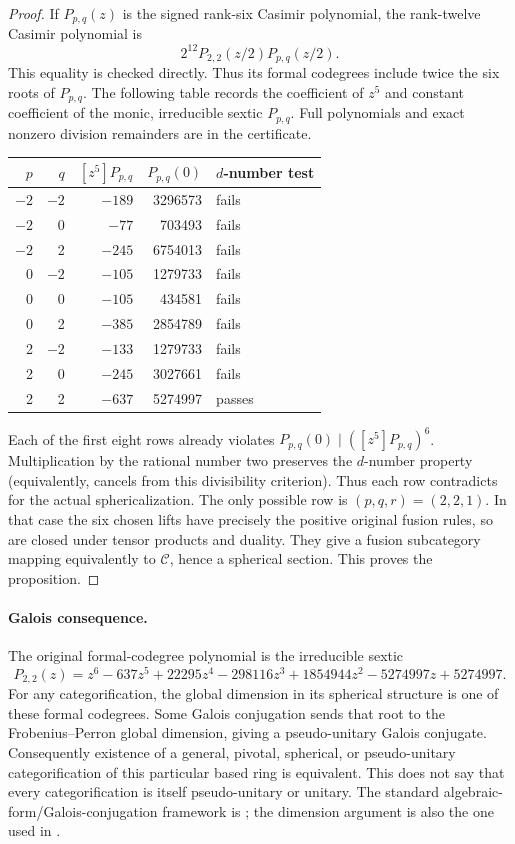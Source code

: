 \documentclass[11pt]{article}
\begin{document}
\begin{proof}
If $P_{p,q}(z)$ is the signed rank-six Casimir polynomial, the rank-twelve
Casimir polynomial is
\[
 2^{12}P_{2,2}(z/2)P_{p,q}(z/2).
\]
This equality is checked directly. Thus its formal codegrees include twice
the six roots of $P_{p,q}$. The following table records the coefficient of
$z^5$ and constant coefficient of the monic, irreducible sextic $P_{p,q}$.
Full polynomials and exact nonzero division remainders are in the certificate.
\begin{center}
\begin{tabular}{rrr r l}\toprule
$p$&$q$&$[z^5]P_{p,q}$&$P_{p,q}(0)$&$d$-number test\\\midrule
$-2$&$-2$&$-189$&3296573&fails\\
$-2$&0&$-77$&703493&fails\\
$-2$&2&$-245$&6754013&fails\\
0&$-2$&$-105$&1279733&fails\\
0&0&$-105$&434581&fails\\
0&2&$-385$&2854789&fails\\
2&$-2$&$-133$&1279733&fails\\
2&0&$-245$&3027661&fails\\
2&2&$-637$&5274997&passes\\\bottomrule
\end{tabular}
\end{center}
Each of the first eight rows already violates
$P_{p,q}(0)\mid([z^5]P_{p,q})^6$. Multiplication by the rational number
two preserves the $d$-number property (equivalently, cancels from this
divisibility criterion). Thus each row contradicts
\cite[Theorem 1.2 and Lemma 2.7(v)]{OstrikCodegrees} for the actual
sphericalization. The only possible row is $(p,q,r)=(2,2,1)$.
In that case the six chosen lifts have precisely the positive original
fusion rules, so are closed under tensor products and duality. They give
a fusion subcategory mapping equivalently to $\mathcal C$, hence a spherical
section. This proves the proposition.
\end{proof}

\paragraph{Galois consequence.}
The original formal-codegree polynomial is the irreducible sextic
\[
 P_{2,2}(z)=z^6-637z^5+22295z^4-298116z^3
 +1854944z^2-5274997z+5274997.
\]
For any categorification, the global dimension in its spherical structure is
one of these formal codegrees. Some Galois conjugation sends that root to the
Frobenius--Perron global dimension, giving a pseudo-unitary Galois conjugate.
Consequently existence of a general, pivotal, spherical, or pseudo-unitary
categorification of this particular based ring is equivalent. This does not
say that every categorification is itself pseudo-unitary or unitary.
The standard algebraic-form/Galois-conjugation framework is
\cite{ENO}; the dimension argument is also the one used in
\cite[Lemma 3.4]{OstrikRank3}.
\end{document}
